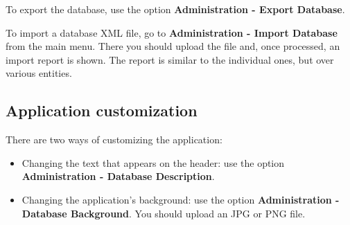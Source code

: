 To export the database, use the option \textbf{Administration - Export Database}.

To import a database XML file, go to \textbf{Administration - Import Database} from
the main menu. There you should upload the file and, once processed, an import report
is shown. The report is similar to the individual ones, but over various entities.

\subsection{Application customization}

There are two ways of customizing the application:

\begin{itemize}
  \item Changing the text that appears on the header: use the option \textbf{Administration - Database Description}.
  \item Changing the application's background: use the option \textbf{Administration - Database Background}. You should upload an JPG or PNG file.
\end{itemize}